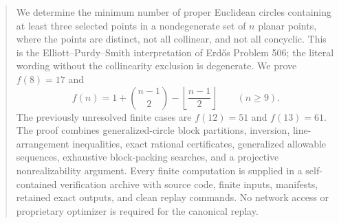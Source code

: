 \begin{abstract}
We determine the minimum number of proper Euclidean circles containing at least three selected points in a nondegenerate set of $n$ planar points, where the points are distinct, not all collinear, and not all concyclic.  This is the Elliott--Purdy--Smith interpretation of Erd\H{o}s Problem 506; the literal wording without the collinearity exclusion is degenerate.  We prove $f(8)=17$ and
\[
 f(n)=1+\binom{n-1}{2}-\left\lfloor\frac{n-1}{2}\right\rfloor
 \qquad(n\ge 9).
\]
The previously unresolved finite cases are $f(12)=51$ and $f(13)=61$.  The proof combines generalized-circle block partitions, inversion, line-arrangement inequalities, exact rational certificates, generalized allowable sequences, exhaustive block-packing searches, and a projective nonrealizability argument.  Every finite computation is supplied in a self-contained verification archive with source code, finite inputs, manifests, retained exact outputs, and clean replay commands.  No network access or proprietary optimizer is required for the canonical replay.
\end{abstract}


\maketitle

\begin{center}
\end{center}

